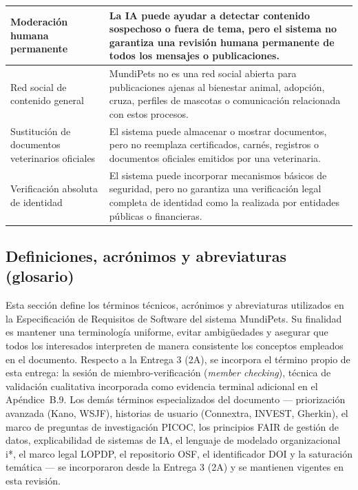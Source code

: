 \documentclass[journal,onecolumn]{IEEEtran}
\begin{document}
\begin{longtable}{|p{4cm}|p{11cm}|}
		\hline
		Moderación humana permanente & La IA puede ayudar a detectar contenido sospechoso o fuera de tema, pero el sistema no garantiza una revisión humana permanente de todos los mensajes o publicaciones. \\
		\hline
		Red social de contenido general & MundiPets no es una red social abierta para publicaciones ajenas al bienestar animal, adopción, cruza, perfiles de mascotas o comunicación relacionada con estos procesos. \\
		\hline
		Sustitución de documentos veterinarios oficiales & El sistema puede almacenar o mostrar documentos, pero no reemplaza certificados, carnés, registros o documentos oficiales emitidos por una veterinaria. \\
		\hline
		Verificación absoluta de identidad & El sistema puede incorporar mecanismos básicos de seguridad, pero no garantiza una verificación legal completa de identidad como la realizada por entidades públicas o financieras. \\
		\hline
	\end{longtable}
	
	\subsection{Definiciones, acrónimos y abreviaturas (glosario)}
	\label{sec:glosario}
	
	Esta sección define los términos técnicos, acrónimos y abreviaturas utilizados
	en la Especificación de Requisitos de Software del sistema MundiPets. Su
	finalidad es mantener una terminología uniforme, evitar ambigüedades y
	asegurar que todos los interesados interpreten de manera consistente los
	conceptos empleados en el documento. Respecto a la Entrega 3 (2A), se
	incorpora el término propio de esta entrega: la sesión de
	miembro-verificación (\emph{member checking}), técnica de validación
	cualitativa incorporada como evidencia terminal adicional en el Apéndice~B.9.
	Los demás términos especializados del documento --- priorización avanzada
	(Kano, WSJF), historias de usuario (Connextra, INVEST, Gherkin), el marco de
	preguntas de investigación PICOC, los principios FAIR de gestión de datos,
	explicabilidad de sistemas de IA, el lenguaje de modelado organizacional i*,
	el marco legal LOPDP, el repositorio OSF, el identificador DOI y la
	saturación temática --- se incorporaron desde la Entrega 3 (2A) y se
	mantienen vigentes en esta revisión.
	
\end{document}
